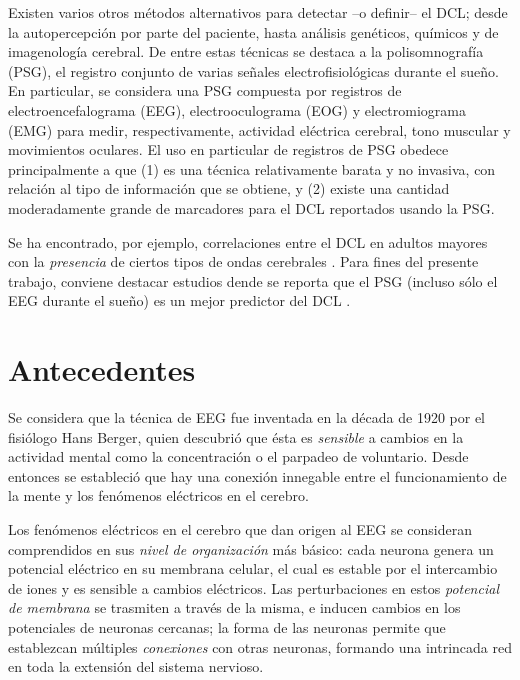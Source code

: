 \documentclass[12pt,letterpaper]{book}
\begin{document}
Existen varios otros métodos alternativos para detectar --o definir-- el DCL; desde la autopercepción por parte del paciente, hasta análisis genéticos, químicos y de imagenología cerebral.
%
De entre estas técnicas se destaca a la polisomnografía (PSG), el registro conjunto de varias señales electrofisiológicas durante el sueño.
%
En particular, se considera una PSG compuesta por registros de electroencefalograma (EEG), electrooculograma (EOG) y electromiograma (EMG) para medir, respectivamente, actividad eléctrica cerebral, tono muscular y movimientos oculares.
%
El uso en particular de registros de PSG obedece principalmente a que (1) es una técnica relativamente barata y no invasiva, con relación al tipo de información que se obtiene, y (2) existe una cantidad moderadamente grande de marcadores para el DCL reportados usando la PSG.

Se ha encontrado, por ejemplo, correlaciones entre el DCL en adultos mayores con la \textit{presencia} de ciertos tipos de ondas cerebrales \cite{babiloni13,prichep06,prichep94}.
%
Para fines del presente trabajo, conviene destacar estudios dende se reporta que el PSG (incluso sólo el EEG durante el sueño) es un mejor predictor del DCL \cite{Brayet16}.


\section*{Antecedentes}

Se considera que la técnica de EEG fue inventada en la década de 1920 por el fisiólogo Hans Berger, quien descubrió que ésta es \textit{sensible} a cambios en la actividad mental como la concentración o el parpadeo de voluntario.
%
Desde entonces se estableció que hay una conexión innegable entre el funcionamiento de la mente y los fenómenos eléctricos en el cerebro.
%

Los fenómenos eléctricos en el cerebro que dan origen al EEG se consideran comprendidos en sus \textit{nivel de organización} más básico: cada neurona genera un potencial eléctrico en su membrana celular, el cual es estable por el intercambio de iones y es sensible a cambios eléctricos.
%
Las perturbaciones en estos \textit{potencial de membrana} se trasmiten a través de la misma, e inducen cambios en los potenciales de neuronas cercanas; la forma de las neuronas permite que establezcan múltiples \textit{conexiones} con otras neuronas, formando una intrincada red en toda la extensión del sistema nervioso.
%
%
\end{document}
